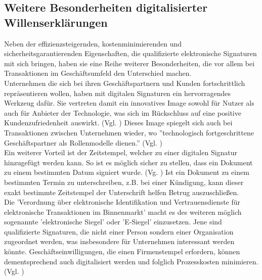 \documentclass[deutsch]{lib/llncs/llncs}
\begin{document}
\subsection{Weitere Besonderheiten digitalisierter Willenserklärungen}
Neben der effizienzsteigernden, kostenminimierenden und sicherheitsgarantierenden Eigenschaften, die qualifizierte elektronische Signaturen mit sich bringen, haben sie eine Reihe weiterer Besonderheiten, die vor allem bei Transaktionen im Geschäftsumfeld den Unterschied machen. \\
Unternehmen die sich bei ihren Geschäftspartnern und Kunden fortschrittlich repräsentieren wollen, haben mit digitalen Signaturen ein hervorragendes Werkzeug dafür. Sie vertreten damit ein innovatives Image sowohl für Nutzer als auch für Anbieter der Technologie, was sich im Rückschluss auf eine positive Kundenzufriedenheit auswirkt. (Vgl. \cite[S. 7]{arthurdlittle2015digitale}) Dieses Image spiegelt sich auch bei Transaktionen zwischen Unternehmen wieder, wo ''technologisch fortgeschrittene Geschäftspartner als Rollenmodelle dienen.'' (Vgl. \cite[S. 12]{arthurdlittle2015digitale}) \\
Ein weiterer Vorteil ist der Zeitstempel, welcher zu einer digitalen Signatur hinzugefügt werden kann. So ist es möglich sicher zu stellen, dass ein Dokument zu einem bestimmten Datum signiert wurde. (Vg. \cite[S. 7]{arthurdlittle2015digitale}) Ist ein Dokument zu einem bestimmten Termin zu unterschreiben, z.B. bei einer Kündigung, kann dieser exakt bestimmte Zeitstempel der Unterschrift helfen Betrug auszuschließen. \\
Die 'Verordnung über elektronische Identifikation und Vertrauensdienste für elektronische Transaktionen im Binnenmarkt' macht es des weiteren möglich sogenannte 'elektronische Siegel' oder 'E-Siegel' einzusetzen. Jene sind qualifizierte Signaturen, die nicht einer Person sondern einer Organisation zugeordnet werden, was insbesondere für Unternehmen interessant werden könnte. Geschäftseinwilligungen, die einen Firmenstempel erfordern, können dementsprechend auch digitalisiert werden und folglich Prozesskosten minimieren. (Vgl. \cite[S. 30-31]{arthurdlittle2015digitale})
\end{document}
